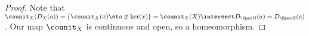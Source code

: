 \begin{proof}
Note that 
$\counit_X(D_X(a))= \{\counit_X(x) \st a\not\in \ker(x)\} = \counit_X(X) \intersect D_{\Spec R}(a) = D_{\Spec R}(a)$.
Our map $\counit_X$ is continuous and open, so a homeomorphism.
\end{proof}
